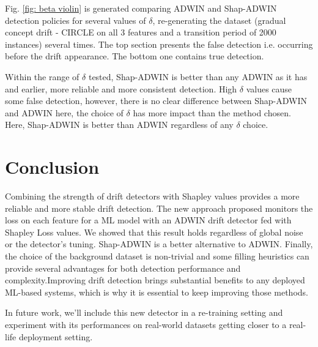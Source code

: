 \documentclass[runningheads]{llncs}
\begin{document}
Fig. \ref{fig: beta violin} is generated comparing ADWIN and Shap-ADWIN detection policies for several values of $\delta$, re-generating the dataset (gradual concept drift - CIRCLE on all 3 features and a transition period of 2000 instances) several times.
The top section presents the false detection i.e. occurring before the drift appearance. The bottom one contains true detection.

Within the range of $\delta$ tested, Shap-ADWIN is better than any ADWIN as it has and earlier, more reliable and more consistent detection. 
High $\delta$ values cause some false detection, however, there is no clear difference between Shap-ADWIN and ADWIN here, the choice of $\delta$ has more impact than the method chosen.
Here, Shap-ADWIN is better than ADWIN regardless of any $\delta$ choice.

\section{Conclusion} 
Combining the strength of drift detectors with Shapley values provides a more reliable and more stable drift detection. The new approach proposed monitors the loss on each feature for a ML model with an ADWIN drift detector fed with Shapley Loss values. We showed that this result holds regardless of global noise or the detector's tuning. Shap-ADWIN is a better alternative to ADWIN. Finally, the choice of the background dataset is non-trivial and some filling heuristics can provide several advantages for both detection performance and complexity.Improving drift detection brings substantial benefits to any deployed ML-based systems, which is why it is essential to keep improving those methods.

In future work, we'll include this new detector in a re-training setting and experiment with its performances on real-world datasets getting closer to a real-life deployment setting.



%
%






    
        
\end{document}
